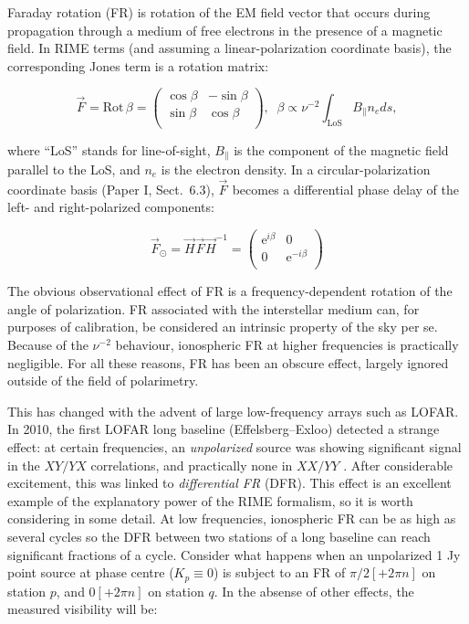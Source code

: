\documentclass[referee]{aa}
\newcommand{\matrixtt}[4]{\left( \begin{array}{cc}#1&#2\\#3&#4\\\end{array} \right)}
\newcommand{\jones}[2]{\vec {#1}_{#2}}
\newcommand{\jonesinv}[2]{\vec {#1}^{-1}_{#2}}
\begin{document}
Faraday rotation (FR) is rotation of the EM field vector that occurs during propagation through a medium of free electrons in the presence of a magnetic field. In RIME terms (and assuming a linear-polarization coordinate basis), the corresponding Jones term is a rotation matrix:

\begin{equation}\label{eq:FR}
\jones{F}{} = \mathrm{Rot}\,\beta = \matrixtt{\cos\beta}{-\sin\beta}{\sin\beta}{\cos\beta}, \;\;
\beta \propto \nu^{-2} \int_\mathrm{LoS} B_{\parallel} n_e ds,
\end{equation}

where ``LoS'' stands for line-of-sight, $B_{\parallel}$ is the component of the magnetic field parallel to the LoS, and $n_e$ is the electron density. In a circular-polarization coordinate basis (Paper I, Sect.~6.3), $\jones{F}{}$ becomes a differential phase delay of the left- and right-polarized components:

\[
\jones{F}{\odot} = \jones{H}{}\jones{F}{}\jonesinv{H}{} = \matrixtt{\mathrm{e}^{i\beta}}{0}{0}{\mathrm{e}^{-i\beta}}
\]

The obvious observational effect of FR is a frequency-dependent rotation of the angle of polarization. FR associated with the interstellar medium can, for purposes of calibration, be considered an intrinsic property of the sky per se. Because of the $\nu^{-2}$ behaviour, ionospheric FR at higher frequencies is practically negligible. For all these reasons, FR has been an obscure effect, largely ignored outside of the field of polarimetry.

This has changed with the advent of large low-frequency arrays such as LOFAR. In 2010, the first LOFAR long baseline (Effelsberg--Exloo) detected a strange effect: at certain frequencies, an \emph{unpolarized} source was showing significant signal in the $XY/YX$ correlations, and practically none in $XX/YY$ \citep{Wucknitz:DFR}. After considerable excitement, this was linked to \emph{differential FR} (DFR). This effect is an excellent example of the explanatory power of the RIME formalism, so it is worth considering in some detail. At low frequencies, ionospheric FR can be as high as several cycles \citep[e.g. 15 cycles at 100 MHz, see][Sect.~10.3]{tms} so the DFR between two stations of a long baseline can reach significant fractions of a cycle. Consider what happens when an unpolarized 1 Jy point source at phase centre ($K_p\equiv0$) is subject to an FR of $\pi/2[+2\pi n]$ on station $p$, and $0[+2\pi n]$ on station $q$. In the absense of other effects, the measured visibility will be:
\end{document}
